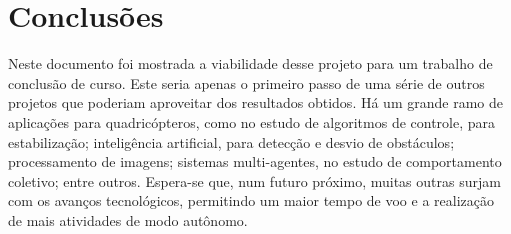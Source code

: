 
\chapter{Conclusões} \label{cap:concl}

Neste documento foi mostrada a viabilidade desse projeto para um trabalho de conclusão de curso. Este seria apenas o primeiro passo de uma série de outros projetos que poderiam aproveitar dos resultados obtidos. Há um grande ramo de aplicações para quadricópteros, como no estudo de algoritmos de controle, para estabilização; inteligência artificial, para detecção e desvio de obstáculos; processamento de imagens; sistemas multi-agentes, no estudo de comportamento coletivo; entre outros. Espera-se que, num futuro próximo, muitas outras surjam com os avanços tecnológicos, permitindo um maior tempo de voo e a realização de mais atividades de modo autônomo.